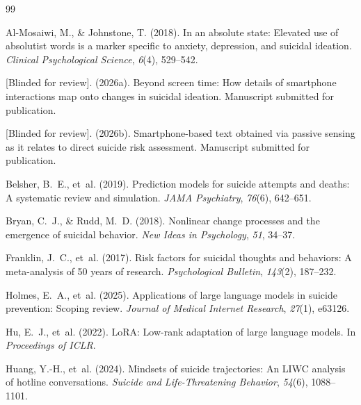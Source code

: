 \documentclass[review,12pt,authoryear]{elsarticle}
\begin{document}
\begin{thebibliography}{99}

Al-Mosaiwi, M., \& Johnstone, T. (2018).
\newblock In an absolute state: {E}levated use of absolutist words is a marker specific to anxiety, depression, and suicidal ideation.
\newblock \textit{Clinical Psychological Science}, \textit{6}(4), 529--542.

[Blinded for review]. (2026a).
\newblock Beyond screen time: {H}ow details of smartphone interactions map onto changes in suicidal ideation.
\newblock Manuscript submitted for publication.

[Blinded for review]. (2026b).
\newblock Smartphone-based text obtained via passive sensing as it relates to direct suicide risk assessment.
\newblock Manuscript submitted for publication.

Belsher, B.~E., et~al. (2019).
\newblock Prediction models for suicide attempts and deaths: {A} systematic review and simulation.
\newblock \textit{JAMA Psychiatry}, \textit{76}(6), 642--651.

Bryan, C.~J., \& Rudd, M.~D. (2018).
\newblock Nonlinear change processes and the emergence of suicidal behavior.
\newblock \textit{New Ideas in Psychology}, \textit{51}, 34--37.

Franklin, J.~C., et~al. (2017).
\newblock Risk factors for suicidal thoughts and behaviors: {A} meta-analysis of 50 years of research.
\newblock \textit{Psychological Bulletin}, \textit{143}(2), 187--232.

Holmes, E.~A., et~al. (2025).
\newblock Applications of large language models in suicide prevention: {S}coping review.
\newblock \textit{Journal of Medical Internet Research}, \textit{27}(1), e63126.

Hu, E.~J., et~al. (2022).
\newblock Lo{RA}: {L}ow-rank adaptation of large language models.
\newblock In \textit{Proceedings of ICLR}.

Huang, Y.-H., et~al. (2024).
\newblock Mindsets of suicide trajectories: {A}n {LIWC} analysis of hotline conversations.
\newblock \textit{Suicide and Life-Threatening Behavior}, \textit{54}(6), 1088--1101.


\end{thebibliography}
\end{document}

